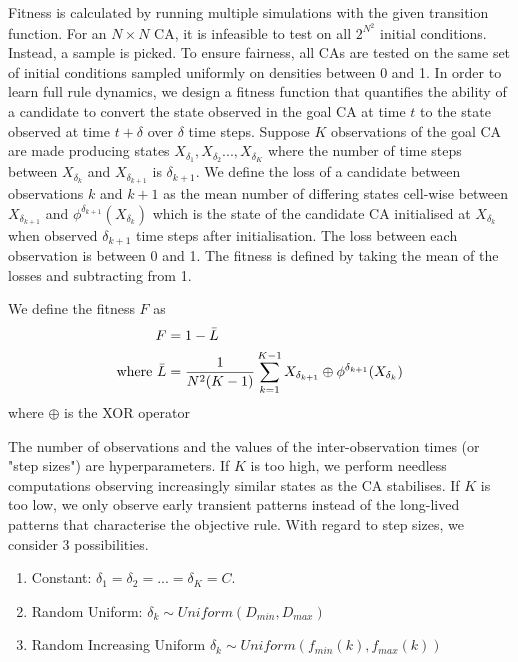 Fitness is calculated by running multiple simulations with the given transition function. For an $N \times N$ CA, it is infeasible to test on all $2^{N^2}$ initial conditions. Instead, a sample is picked. To ensure fairness, all CAs are tested on the same set of initial conditions sampled uniformly on densities between 0 and 1. In order to learn full rule dynamics, we design a fitness function that quantifies the ability of a candidate to convert the state observed in the goal CA at time $t$ to the state observed at time $t+\delta$ over $\delta$ time steps. Suppose $K$ observations of the goal CA are made producing states $X_{\delta_1}, X_{\delta_2} ..., X_{\delta_K}$ where the number of time steps between $X_{\delta_k}$ and $X_{\delta_{k+1}}$ is $\delta_{k+1}$. We define the loss of a candidate between observations $k$ and $k+1$ as the mean number of differing states cell-wise between $X_{\delta_{k+1}}$ and $\phi^{\delta_{k+1}}(X_{\delta_k})$ which is the state of the candidate CA initialised at $X_{\delta_k}$ when observed $\delta_{k+1}$ time steps after initialisation. The loss between each observation is between 0 and 1. The fitness is defined by taking the mean of the losses and subtracting from 1.

\begin{definition}
We define the fitness $F$ as
\begin{align*}
    F &= 1 - \bar{L}\\
    \textnormal{where\ } \bar{L} &= \frac{1}{N^2(K-1)}\sum_{k=1}^{K-1} X_{\delta_{k+1}} \oplus \phi^{\delta_{k+1}}(X_{\delta_k})
\end{align*}
where $\oplus$ is the XOR operator
\end{definition}

The number of observations and the values of the inter-observation times (or "step sizes") are hyperparameters. If $K$ is too high, we perform needless computations observing increasingly similar states as the CA stabilises. If $K$ is too low, we only observe early transient patterns instead of the long-lived patterns that characterise the objective rule. With regard to step sizes, we consider 3 possibilities.

\begin{enumerate}
    \item Constant: $\delta_1 = \delta_2 = ... = \delta_K = C$.
    \item Random Uniform: $\delta_k \sim \mathit{Uniform}(D_{min}, D_{max})$
    \item Random Increasing Uniform $\delta_k \sim \mathit{Uniform}(f_{min}(k), f_{max}(k))$
\end{enumerate}

